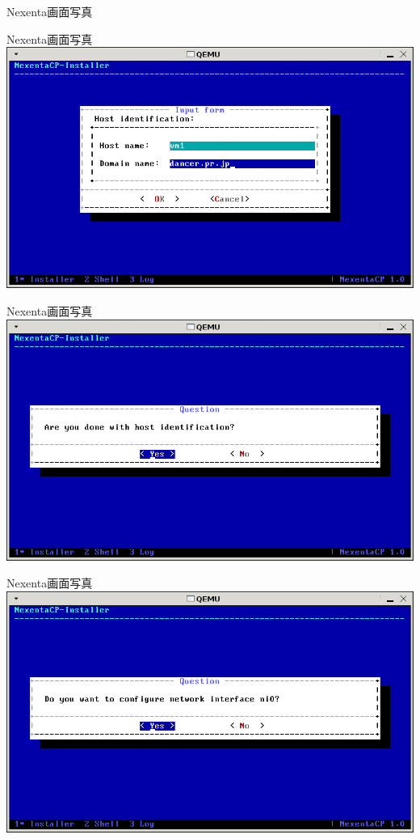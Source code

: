 \documentclass[cjk,dvipdfmx,12pt]{beamer}
\begin{document}
\begin{frame}{Nexenta画面写真}
\end{frame}\begin{frame}{Nexenta画面写真} 
\includegraphics[width=1.0\hsize]{image200804/nexenta16.png}
\end{frame}\begin{frame}{Nexenta画面写真} 
\includegraphics[width=1.0\hsize]{image200804/nexenta17.png}
\end{frame}\begin{frame}{Nexenta画面写真} 
\includegraphics[width=1.0\hsize]{image200804/nexenta18.png}

\end{frame}
\end{document}
